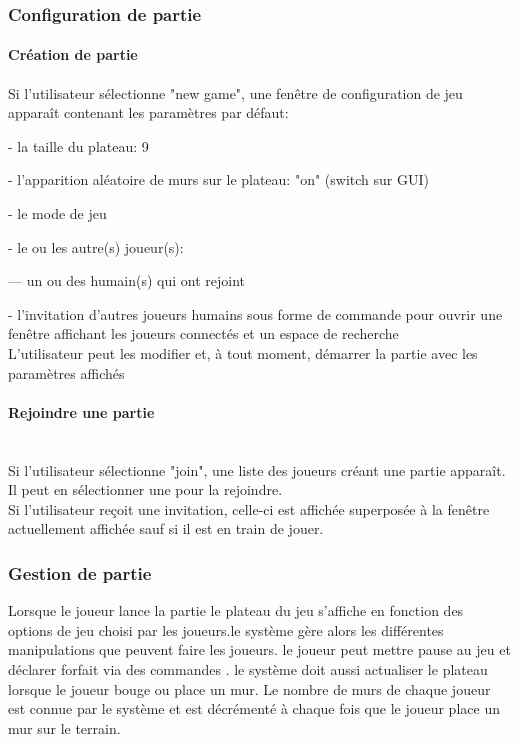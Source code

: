 \documentclass[french, utf8]{article}
\begin{document}
\subsubsection{Configuration de partie}
\paragraph{Création de partie}
\label{sec:CréationDePartie}
Si l’utilisateur sélectionne
"new game",
une fenêtre de configuration de jeu apparaît contenant les paramètres par défaut:
\item- la taille du plateau: 9
\item- l'apparition aléatoire de murs sur le plateau: "on" (switch sur GUI)
\item- le mode de jeu
\item- le ou les autre(s) joueur(s):
\item---  un ou des humain(s) qui ont rejoint
\item- l'invitation d'autres joueurs humains sous forme de commande pour ouvrir une fenêtre affichant les joueurs connectés et un espace de recherche
\\L'utilisateur peut les modifier et, à tout moment, démarrer la partie avec les paramètres
affichés

\paragraph{Rejoindre une partie}
\\Si l’utilisateur sélectionne
"join", une liste des joueurs créant une partie apparaît.
\\Il peut en sélectionner une pour la rejoindre.
\\Si l’utilisateur reçoit une invitation, celle-ci est affichée superposée à la fenêtre actuellement affichée sauf si il est en train de jouer.

\subsubsection{Gestion de partie}
\label{sec:GestionDePartie}
Lorsque le joueur lance la partie le plateau du jeu s'affiche en fonction des options de jeu choisi par les joueurs.le système gère alors les différentes manipulations que peuvent faire les joueurs. le joueur peut mettre pause au jeu et déclarer forfait via des commandes  . le système doit aussi actualiser le plateau lorsque le joueur bouge ou place un mur. Le nombre de murs de chaque joueur est connue par le système et est décrémenté à chaque fois que le joueur place un mur sur le terrain.
\end{document}
